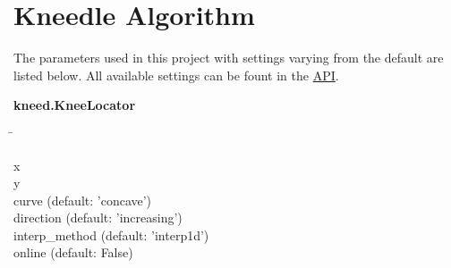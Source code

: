 \section{Kneedle Algorithm} \label{sec:Kneedle}

\blindtext
\autocite{satopaa_finding_2011}

The parameters used in this project with settings varying from the default are listed below. All available settings can be fount in the \href{https://kneed.readthedocs.io/en/stable/api.html}{API}.

\begin{leftbar}
    \textbf{kneed.KneeLocator}
    \begin{nstabbing}
        \qquad\qquad\qquad\qquad\qquad\quad\=\kill

        x \> \\
        
        y \> \\
        
        curve \> (default: 'concave')\\
        
        direction \> (default: 'increasing')\\
        
        interp\_method \> (default: 'interp1d')\\
        
        online \> (default: False)\\
        
    \end{nstabbing}
\end{leftbar}

